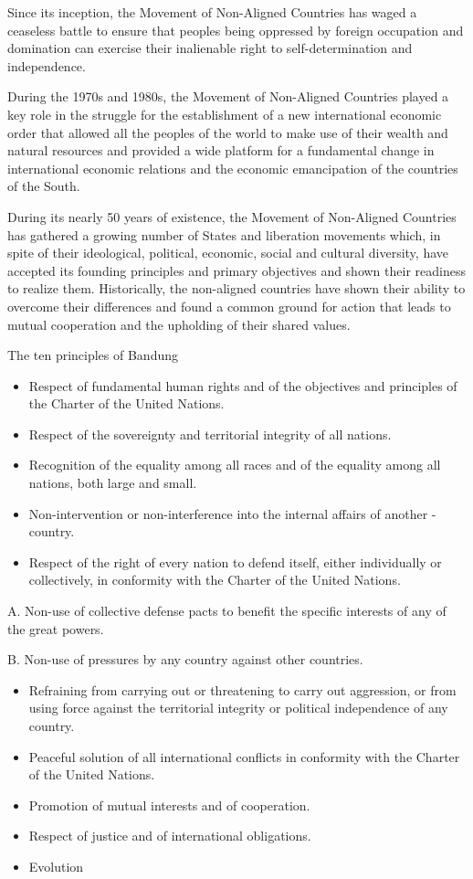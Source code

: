 \documentclass[
  openany]{book}
\providecommand{\tightlist}{%
  \setlength{\itemsep}{0pt}\setlength{\parskip}{0pt}}
\begin{document}
Since its inception, the Movement of Non-Aligned Countries has waged a ceaseless battle to ensure that peoples being oppressed by foreign occupation and domination can exercise their inalienable right to self-determination and independence.

During the 1970s and 1980s, the Movement of Non-Aligned Countries played a key role in the struggle for the establishment of a new international economic order that allowed all the peoples of the world to make use of their wealth and natural resources and provided a wide platform for a fundamental change in international economic relations and the economic emancipation of the countries of the South.

During its nearly 50 years of existence, the Movement of Non-Aligned Countries has gathered a growing number of States and liberation movements which, in spite of their ideological, political, economic, social and cultural diversity, have accepted its founding principles and primary objectives and shown their readiness to realize them. Historically, the non-aligned countries have shown their ability to overcome their differences and found a common ground for action that leads to mutual cooperation and the upholding of their shared values.

The ten principles of Bandung

\begin{itemize}
\tightlist
\item
  Respect of fundamental human rights and of the objectives and principles of the Charter of the United Nations.
\item
  Respect of the sovereignty and territorial integrity of all nations.
\item
  Recognition of the equality among all races and of the equality among all nations, both large and small.
\item
  Non-intervention or non-interference into the internal affairs of another -country.
\item
  Respect of the right of every nation to defend itself, either individually or collectively, in conformity with the Charter of the United Nations.
\end{itemize}

A. Non-use of collective defense pacts to benefit the specific interests of any of the great powers.

B. Non-use of pressures by any country against other countries.

\begin{itemize}
\tightlist
\item
  Refraining from carrying out or threatening to carry out aggression, or from using force against the territorial integrity or political independence of any country.
\item
  Peaceful solution of all international conflicts in conformity with the Charter of the United Nations.
\item
  Promotion of mutual interests and of cooperation.
\item
  Respect of justice and of international obligations.
\item
  Evolution
\end{itemize}
\end{document}
